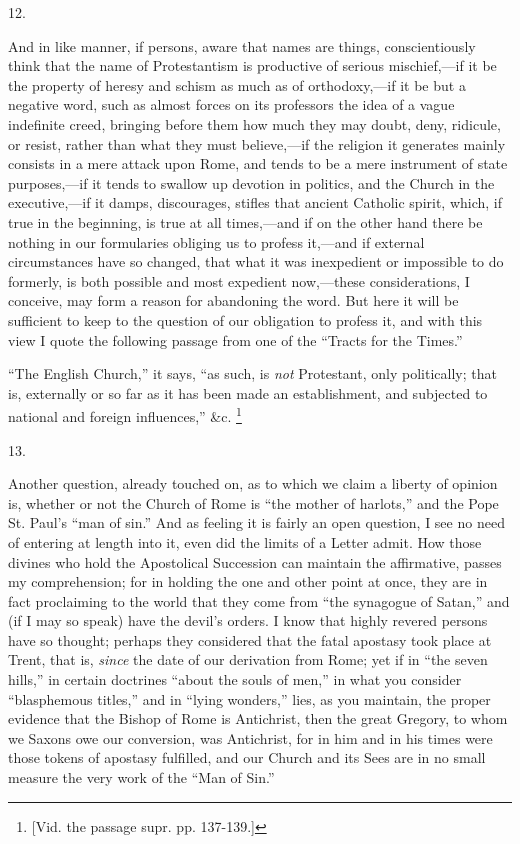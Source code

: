 12.

And in like manner, if persons, aware that names
are things, conscientiously think that the name of Protestantism is
productive of serious mischief,—if it be the property of heresy and
schism as much as of orthodoxy,—if it be but a negative word, such
as almost forces on its professors the idea of a vague indefinite
creed, bringing before them how much they may doubt, deny, ridicule,
or resist, rather than what they must believe,—if the religion it
generates mainly consists in a mere attack upon Rome, and tends to be
a mere instrument of state purposes,—if it tends to swallow up
devotion in politics, and the Church in the executive,—if it damps,
discourages, stifles that ancient Catholic spirit, which, if true in
the beginning, is true at all times,—and if on the other hand there
be nothing in our formularies obliging us to profess it,—and if
external circumstances have so changed, that what it was inexpedient
or impossible to do formerly, is both possible and most expedient
now,—these considerations, I conceive, may form a reason for
abandoning the word. But here it will be sufficient to keep to the
question of our obligation to profess it, and with this view I quote
the following passage from one of the ``Tracts for the Times.''

``The English Church,'' it says, ``as such, is
\emph{not} Protestant, only politically; that is, externally or so far
as it has been made an establishment, and subjected to national and
foreign influences,'' \&c. \footnote{[Vid. the passage supr. pp. 137-139.]}

13.

Another question, already touched on, as to which
we claim a liberty of opinion is, whether or not the Church of Rome is
``the mother of harlots,'' and the Pope St. Paul's ``man of
sin.'' And as feeling it is fairly an open question, I see no need of
entering at length into it, even did the limits of a Letter admit. How
those divines who hold the Apostolical Succession can maintain the
affirmative, passes my comprehension; for in holding the one and other
point at once, they are in fact proclaiming to the world that they
come from ``the synagogue of Satan,'' and (if I may so speak) have
the devil's orders. I know that highly revered persons have so
thought; perhaps they considered that the fatal apostasy took place at
Trent, that is, \emph{since} the date of our derivation from Rome; yet
if in ``the seven hills,'' in certain doctrines ``about the souls
of men,'' in what you consider ``blasphemous titles,'' and in ``lying wonders,'' lies, as you maintain, the proper evidence that
the Bishop of Rome is Antichrist, then the great Gregory, to whom we
Saxons owe our conversion, was Antichrist, for in him and in his times
were those tokens of apostasy fulfilled, and our Church and its Sees
are in no small measure the very work of the ``Man of Sin.''

